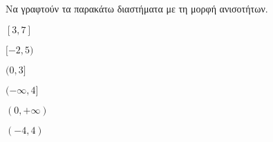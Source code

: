 Να γραφτούν τα παρακάτω διαστήματα με τη μορφή ανισοτήτων.
\begin{multicols}{3}
\begin{alist}
\item $ [3,7] $
\item $ [-2,5) $
\item $ (0,3] $
\item $ (-\infty,4] $
\item $ (0,+\infty) $
\item $ (-4,4) $
\end{alist}
\end{multicols}

